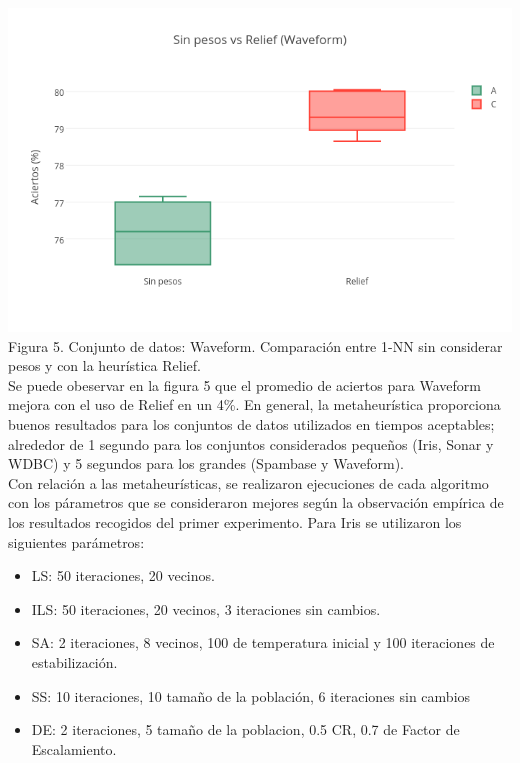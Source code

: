 \documentclass{ci5652}
\begin{document}
\includegraphics[width=\columnwidth]{no_weights-Relief_Waveform}
{\small Figura 5. Conjunto de datos: Waveform. Comparación entre 1-NN sin
considerar pesos y con la heurística Relief.}\\

Se puede obeservar en la figura 5 que el promedio de aciertos para Waveform
mejora con el uso de Relief en un 4\%. En general, la metaheurística proporciona
buenos resultados para los conjuntos de datos utilizados en tiempos aceptables;
alrededor de 1 segundo para los conjuntos considerados pequeños (Iris, Sonar y
WDBC) y 5 segundos para los grandes (Spambase y Waveform).\\

Con relación a las metaheurísticas, se realizaron ejecuciones de cada algoritmo
con los párametros que se consideraron mejores según la observación empírica de
los resultados recogidos del primer experimento. Para Iris se utilizaron los
siguientes parámetros:

\begin{itemize}
  \item LS: 50 iteraciones, 20 vecinos.
  \item ILS: 50 iteraciones, 20 vecinos, 3 iteraciones sin cambios.
  \item SA: 2 iteraciones, 8 vecinos, 100 de temperatura inicial y 100
  iteraciones de estabilización.
  \item SS: 10 iteraciones, 10 tamaño de la población, 6 iteraciones sin cambios
  \item DE: 2 iteraciones, 5 tamaño de la poblacion, 0.5 CR, 0.7 de Factor de
  Escalamiento.
\end{itemize}
\end{document}
